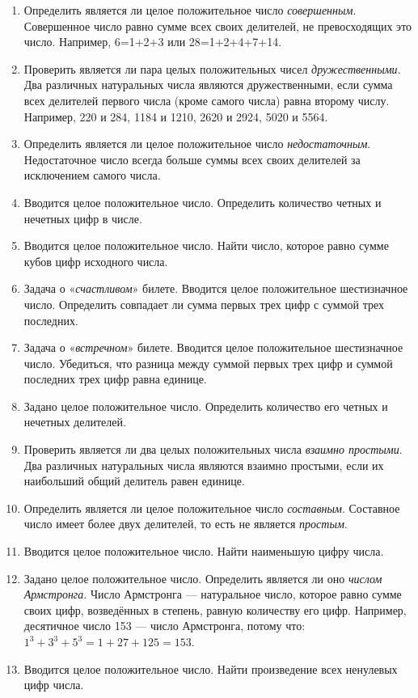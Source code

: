 \begin{enumerate}
\item Определить является ли целое положительное число \emph{совершенным}. Совершенное число равно сумме
всех своих делителей, не превосходящих это число. Например, 6=1+2+3 или 28=1+2+4+7+14.
\item Проверить является ли пара целых положительных чисел \emph{дружественными}. Два различных натуральных
числа являются дружественными, если сумма всех делителей первого числа (кроме самого числа) равна второму числу.
Например, 220 и 284, 1184 и 1210, 2620 и 2924, 5020 и 5564.
\item Определить является ли целое положительное число \emph{недостаточным}. Недостаточное число всегда
больше суммы всех своих делителей за исключением самого числа.
\item Вводится целое положительное число. Определить количество четных и нечетных цифр в числе.
\item Вводится целое положительное число. Найти число, которое равно сумме кубов цифр исходного числа.
\item Задача о «\emph{счастливом}» билете. Вводится целое положительное шестизначное число. Определить
совпадает ли сумма первых трех цифр с суммой трех последних.
\item Задача о «\emph{встречном}» билете. Вводится целое положительное шестизначное число. Убедиться, что
разница между суммой первых трех цифр и суммой последних трех цифр равна единице.
\item Задано целое положительное число. Определить количество его четных и нечетных делителей.
\item Проверить является ли два целых положительных числа \emph{взаимно простыми}. Два различных
натуральных числа являются взаимно простыми, если их наибольший общий делитель равен единице.
\item Определить является ли целое положительное число \emph{составным}. Составное число имеет более двух
делителей, то есть не является \emph{простым}.
\item Вводится целое положительное число. Найти наименьшую цифру числа.
\item Задано целое положительное число. Определить является ли оно \emph{числом Армстронга}. Число
Армстронга --- натуральное число, которое равно сумме своих цифр, возведённых в степень, равную количеству его цифр.
Например, десятичное число 153 --- число Армстронга, потому что:  $1^3+3^3+5^3=1+27+125=153$.
\item Вводится целое положительное число. Найти произведение всех ненулевых цифр числа.

\end{enumerate}
